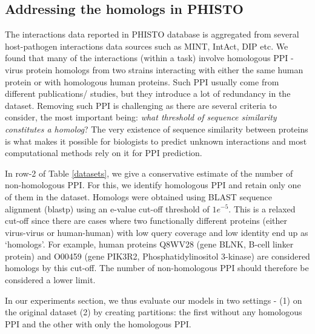 \documentclass{bioinfo}
\begin{document}
\subsection{Addressing the homologs in PHISTO}
\label{sec:phisto}
The interactions data reported in PHISTO database is aggregated from several host-pathogen interactions data sources such as MINT, IntAct, DIP etc. We found that many of the interactions (within a task) involve homologous PPI - virus protein homologs from two strains interacting with either the same human protein or with homologous human proteins. Such PPI usually come from different publications/ studies, but they introduce a lot of redundancy in the dataset. Removing such PPI is challenging as there are several criteria to consider, the most important being: \textit{what threshold of sequence similarity constitutes a homolog}? The very existence of sequence similarity between proteins is what makes it possible for biologists to predict unknown interactions and most computational methods rely on it for PPI prediction. 

In row-2 of Table \ref{datasets}, we give a conservative estimate of the number of non-homologous PPI. For this, we identify homologous PPI and retain only one of them in the dataset. Homologs were obtained using BLAST sequence alignment (blastp) using an e-value cut-off threshold of $1e^{-5}$. This is a relaxed cut-off since there are cases where two functionally different proteins (either virus-virus or human-human) with low query coverage and low identity end up as `homologs'. For example, human proteins Q8WV28 (gene BLNK, B-cell linker protein) and O00459 (gene PIK3R2, Phosphatidylinositol 3-kinase) are considered homologs by this cut-off. The number of non-homologous PPI should therefore be considered a lower limit.

In our experiments section, we thus evaluate our models in two settings - (1) on the original dataset (2) by creating partitions: the first without any homologous PPI and the other with only the homologous PPI.

\end{document}
